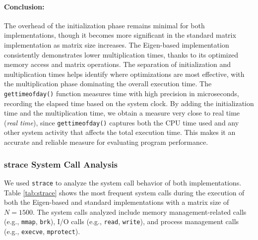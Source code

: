\documentclass{article}
\begin{document}
    \paragraph{Conclusion:}
    The overhead of the initialization phase remains minimal for both implementations, though it becomes more significant in the standard matrix implementation as matrix size increases. The Eigen-based implementation consistently demonstrates lower multiplication times, thanks to its optimized memory access and matrix operations. The separation of initialization and multiplication times helps identify where optimizations are most effective, with the multiplication phase dominating the overall execution time. The \texttt{gettimeofday()} function measures time with high precision in microseconds, recording the elapsed time based on the system clock. By adding the initialization time and the multiplication time, we obtain a measure very close to real time (\textit{real time}), since \texttt{gettimeofday()} captures both the CPU time used and any other system activity that affects the total execution time. This makes it an accurate and reliable measure for evaluating program performance.

    \subsubsection{strace System Call Analysis}

    We used \texttt{strace} to analyze the system call behavior of both implementations. Table \ref{tab:strace} shows the most frequent system calls during the execution of both the
    Eigen-based and standard implementations with a matrix size of $N=1500$. The system calls analyzed include memory management-related calls (e.g., \texttt{mmap}, \texttt{brk}), I/O calls (e.g., \texttt{read}, \texttt{write}), and process management calls (e.g., \texttt{execve}, \texttt{mprotect}).
\end{document}
